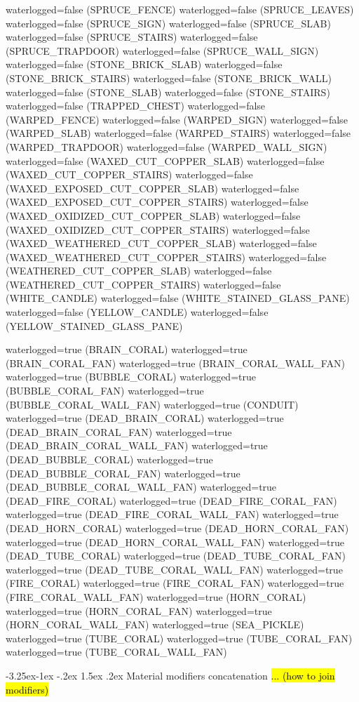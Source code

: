 \documentclass[11pt]{article}
\makeatletter
\renewcommand\subsection{\@startsection{subsection}{2}{\z@}%
                                         {-3.25ex\@plus -1ex \@minus -.2ex}%
                                         {1.5ex \@plus .2ex}%
                                         {\normalfont\fontfamily{phv}\fontsize{14}{17}\bfseries}}
\newcommand\myworries[1]{\sethlcolor{red}\hl{#1}}
\makeatother
\begin{document}
waterlogged=false (SPRUCE_FENCE)
waterlogged=false (SPRUCE_LEAVES)
waterlogged=false (SPRUCE_SIGN)
waterlogged=false (SPRUCE_SLAB)
waterlogged=false (SPRUCE_STAIRS)
waterlogged=false (SPRUCE_TRAPDOOR)
waterlogged=false (SPRUCE_WALL_SIGN)
waterlogged=false (STONE_BRICK_SLAB)
waterlogged=false (STONE_BRICK_STAIRS)
waterlogged=false (STONE_BRICK_WALL)
waterlogged=false (STONE_SLAB)
waterlogged=false (STONE_STAIRS)
waterlogged=false (TRAPPED_CHEST)
waterlogged=false (WARPED_FENCE)
waterlogged=false (WARPED_SIGN)
waterlogged=false (WARPED_SLAB)
waterlogged=false (WARPED_STAIRS)
waterlogged=false (WARPED_TRAPDOOR)
waterlogged=false (WARPED_WALL_SIGN)
waterlogged=false (WAXED_CUT_COPPER_SLAB)
waterlogged=false (WAXED_CUT_COPPER_STAIRS)
waterlogged=false (WAXED_EXPOSED_CUT_COPPER_SLAB)
waterlogged=false (WAXED_EXPOSED_CUT_COPPER_STAIRS)
waterlogged=false (WAXED_OXIDIZED_CUT_COPPER_SLAB)
waterlogged=false (WAXED_OXIDIZED_CUT_COPPER_STAIRS)
waterlogged=false (WAXED_WEATHERED_CUT_COPPER_SLAB)
waterlogged=false (WAXED_WEATHERED_CUT_COPPER_STAIRS)
waterlogged=false (WEATHERED_CUT_COPPER_SLAB)
waterlogged=false (WEATHERED_CUT_COPPER_STAIRS)
waterlogged=false (WHITE_CANDLE)
waterlogged=false (WHITE_STAINED_GLASS_PANE)
waterlogged=false (YELLOW_CANDLE)
waterlogged=false (YELLOW_STAINED_GLASS_PANE)

waterlogged=true (BRAIN_CORAL)
waterlogged=true (BRAIN_CORAL_FAN)
waterlogged=true (BRAIN_CORAL_WALL_FAN)
waterlogged=true (BUBBLE_CORAL)
waterlogged=true (BUBBLE_CORAL_FAN)
waterlogged=true (BUBBLE_CORAL_WALL_FAN)
waterlogged=true (CONDUIT)
waterlogged=true (DEAD_BRAIN_CORAL)
waterlogged=true (DEAD_BRAIN_CORAL_FAN)
waterlogged=true (DEAD_BRAIN_CORAL_WALL_FAN)
waterlogged=true (DEAD_BUBBLE_CORAL)
waterlogged=true (DEAD_BUBBLE_CORAL_FAN)
waterlogged=true (DEAD_BUBBLE_CORAL_WALL_FAN)
waterlogged=true (DEAD_FIRE_CORAL)
waterlogged=true (DEAD_FIRE_CORAL_FAN)
waterlogged=true (DEAD_FIRE_CORAL_WALL_FAN)
waterlogged=true (DEAD_HORN_CORAL)
waterlogged=true (DEAD_HORN_CORAL_FAN)
waterlogged=true (DEAD_HORN_CORAL_WALL_FAN)
waterlogged=true (DEAD_TUBE_CORAL)
waterlogged=true (DEAD_TUBE_CORAL_FAN)
waterlogged=true (DEAD_TUBE_CORAL_WALL_FAN)
waterlogged=true (FIRE_CORAL)
waterlogged=true (FIRE_CORAL_FAN)
waterlogged=true (FIRE_CORAL_WALL_FAN)
waterlogged=true (HORN_CORAL)
waterlogged=true (HORN_CORAL_FAN)
waterlogged=true (HORN_CORAL_WALL_FAN)
waterlogged=true (SEA_PICKLE)
waterlogged=true (TUBE_CORAL)
waterlogged=true (TUBE_CORAL_FAN)
waterlogged=true (TUBE_CORAL_WALL_FAN)


\subsection{Material modifiers concatenation}
\myworries{... (how to join modifiers)}



	
\end{document}
